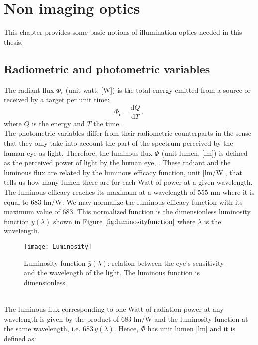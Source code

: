 \chapter{Non imaging optics}
This chapter provides some basic notions of illumination optics needed in this thesis.
\section{Radiometric and photometric variables}

\indent The radiant flux $\Phi_{\textrm{r}}$ (unit watt, [\textrm{W}]) is the total energy emitted from a source or received by a target per unit time:
\begin{equation}
\Phi_{\textrm{r}} = \frac{\textrm{d}Q}{\textrm{d}T}\,,
\end{equation}
where $Q$ is the energy and $T$ the time.\\
\indent The photometric variables differ from their radiometric counterparts in the sense that they only take into account the part of the spectrum perceived by the human eye as light.
 Therefore, the luminous flux $\Phi$ (unit lumen, [\textrm{lm}]) is defined as the perceived power of light by the human eye, \cite{chaves2015introduction}.
 These radiant and the luminous flux are related by the luminous efficacy function, unit [lm/W], that tells us how many lumen there are for each Watt of power at a given wavelength.
 The luminous efficacy reaches its maximum  at a wavelength of $555$ $\textrm{nm}$ where it is equal to $683$ $\textrm{lm}/\textrm{W}$.
  We may normalize the luminous efficacy function with its maximum value of $683$.
  This normalized function is the dimensionless luminosity function $\bar{y}(\lambda)$ shown in Figure $\ref{fig:luminosityfunction}$ where $\lambda$ is the wavelength.
\begin{figure}[htbp]
  \begin{center}
  \texttt{[image: Luminosity]}
  \end{center}
  \caption{Luminosity function $\bar{y}(\lambda)$: relation between the eye's sensitivity and the wavelength of the light. The luminous function is dimensionless.}
  \label{fig:luminosityfunction}
  \end{figure}
\\ The luminous flux corresponding to one Watt of radiation power at any wavelength is given by the product of $683$ $\textrm{lm/W}$ and the luminosity function at the same wavelength,
i.e. $683 \, \bar{y}(\lambda)$. Hence, $\Phi$ has unit lumen [\textrm{lm}] and it is defined as:
